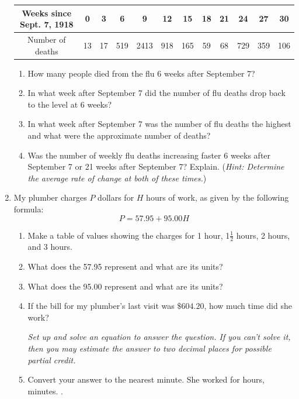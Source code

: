 \documentclass[12pt]{article}
\begin{document}
\begin{enumerate}
\begin{tabular} {|c|c|c|c|c |c|c|c|c|c |c|c|} \hline
Weeks since Sept. 7, 1918 & 0 & 3 & 6  & 9  & 12  & 15  & 18 & 21  & 24  & 27  & 30 \\ \hline
Number of deaths &13 & 17 & 519 & 2413 & 918 & 165 & 59 & 68 & 729 & 359 & 106 \\ \hline
\end{tabular}

\begin{enumerate}
\item How many people died from the flu 6 weeks after September 7?
\vfill
\item In what week after September 7 did the number of flu deaths drop back to the level at 6 weeks?
\vfill
\item In what week after September 7 was the number of flu deaths the highest and what were the approximate number of deaths?
\vfill
\item Was the number of weekly flu deaths increasing faster 6 weeks after September 7 or 21 weeks after September 7?  Explain. (\emph{Hint: Determine the average rate of change at both of these times.})
\vfill
\end{enumerate}

\newpage %

\item My plumber charges $P$ dollars for $H$ hours of work, as given by the following formula:
$$P = 57.95 + 95.00H$$

\begin{enumerate}
\item Make a table of values showing the charges for 1 hour, 1$\frac{1}{2}$ hours, 2 hours, and 3 hours.
\vfill
\item What does the 57.95 represent and what are its units?
\vfill
\item What does the 95.00 represent and what are its units?
\vfill
\item If the bill for my plumber's last visit was $\$604.20$, how much time did she work?

\emph{Set up and solve an equation to answer the question.  If you can't solve it, then you may estimate the answer to two decimal places for possible partial credit.}
\vfill
\vfill
\vfill
\item Convert your answer to the nearest minute.
\vfill
She worked for \hrulefill hours, \hrulefill minutes. \hspace{3in}.
\end{enumerate}


\end{enumerate}
\end{document}
